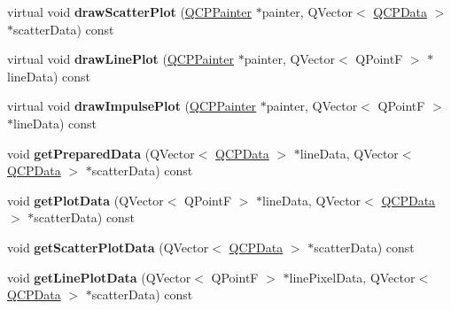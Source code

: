 \begin{DoxyCompactItemize}
\item 
\hypertarget{classQCPGraph_a6bdc385b122ce06134d4196373ae2250}{}virtual void {\bfseries draw\+Scatter\+Plot} (\hyperlink{classQCPPainter}{Q\+C\+P\+Painter} $\ast$painter, Q\+Vector$<$ \hyperlink{classQCPData}{Q\+C\+P\+Data} $>$ $\ast$scatter\+Data) const \label{classQCPGraph_a6bdc385b122ce06134d4196373ae2250}

\item 
\hypertarget{classQCPGraph_acebc22c3385829b19a87e6281fe6ade2}{}virtual void {\bfseries draw\+Line\+Plot} (\hyperlink{classQCPPainter}{Q\+C\+P\+Painter} $\ast$painter, Q\+Vector$<$ Q\+Point\+F $>$ $\ast$line\+Data) const \label{classQCPGraph_acebc22c3385829b19a87e6281fe6ade2}

\item 
\hypertarget{classQCPGraph_abc01180629621f1e47e94559227d3d8c}{}virtual void {\bfseries draw\+Impulse\+Plot} (\hyperlink{classQCPPainter}{Q\+C\+P\+Painter} $\ast$painter, Q\+Vector$<$ Q\+Point\+F $>$ $\ast$line\+Data) const \label{classQCPGraph_abc01180629621f1e47e94559227d3d8c}

\item 
\hypertarget{classQCPGraph_ab420b46ba638dc3252439fe16687b244}{}void {\bfseries get\+Prepared\+Data} (Q\+Vector$<$ \hyperlink{classQCPData}{Q\+C\+P\+Data} $>$ $\ast$line\+Data, Q\+Vector$<$ \hyperlink{classQCPData}{Q\+C\+P\+Data} $>$ $\ast$scatter\+Data) const \label{classQCPGraph_ab420b46ba638dc3252439fe16687b244}

\item 
\hypertarget{classQCPGraph_a466c661e015188971c862031af946693}{}void {\bfseries get\+Plot\+Data} (Q\+Vector$<$ Q\+Point\+F $>$ $\ast$line\+Data, Q\+Vector$<$ \hyperlink{classQCPData}{Q\+C\+P\+Data} $>$ $\ast$scatter\+Data) const \label{classQCPGraph_a466c661e015188971c862031af946693}

\item 
\hypertarget{classQCPGraph_a45c4214b59ea11aa6d8d112bdc3b0e03}{}void {\bfseries get\+Scatter\+Plot\+Data} (Q\+Vector$<$ \hyperlink{classQCPData}{Q\+C\+P\+Data} $>$ $\ast$scatter\+Data) const \label{classQCPGraph_a45c4214b59ea11aa6d8d112bdc3b0e03}

\item 
\hypertarget{classQCPGraph_ae3d82ffd0c9a883482aabf47b0e6b5ee}{}void {\bfseries get\+Line\+Plot\+Data} (Q\+Vector$<$ Q\+Point\+F $>$ $\ast$line\+Pixel\+Data, Q\+Vector$<$ \hyperlink{classQCPData}{Q\+C\+P\+Data} $>$ $\ast$scatter\+Data) const \label{classQCPGraph_ae3d82ffd0c9a883482aabf47b0e6b5ee}


\end{DoxyCompactItemize}
